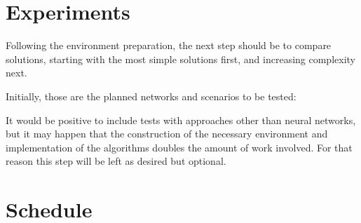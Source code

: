 \section{Experiments}
Following the environment preparation, the next step should be to compare solutions, starting with the most simple solutions first, and increasing complexity next.

Initially, those are the planned networks and scenarios to be tested:

It would be positive to include tests with approaches other than neural networks, but it may happen that the construction of the necessary environment and implementation of the algorithms doubles the amount of work involved. For that reason this step will be left as desired but optional.

\section{Schedule}

